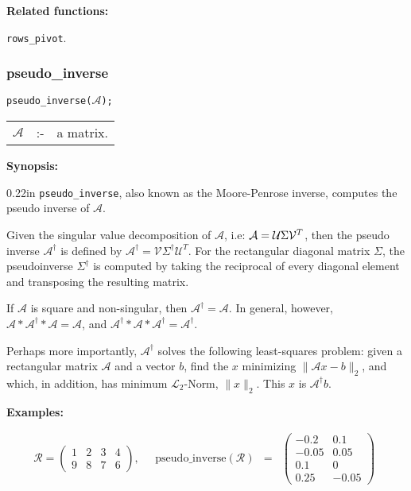 {\bf Related functions:}

\hspace*{0.175in} {\tt rows\_pivot}.


\subsubsection{pseudo\_inverse}
\label{linalg:pseudo_inverse}

\hspace*{0.175in} {\tt pseudo\_inverse($\mathcal{A}$);}

\hspace*{0.1in}  
\begin{tabular}{l l l} 
$\mathcal{A}$ &:-& a matrix.
\end{tabular}

{\bf Synopsis:} %

\begin{addtolength}{\leftskip}{0.22in}
\texttt{pseudo\_inverse}, also known as the Moore-Penrose inverse, computes
the pseudo inverse of $\mathcal{A}$. 

Given the singular value decomposition of $\mathcal{A}$, i.e: $\mathcal{A} = 
{\cal U} 
\Sigma{\cal V}^T$, then the pseudo inverse $\mathcal{A}^{\dagger}$ is defined 
by $\mathcal{A}^{\dagger} = \mathcal{V} \Sigma^{\dagger} \mathcal{U}^{T}$. For the 
rectangular diagonal
matrix $\Sigma$, the pseudoinverse $\Sigma^{\dagger}$ is computed by taking the reciprocal
of every diagonal element and transposing the resulting matrix.

If $\mathcal{A}$ is square and non-singular, then $\mathcal{A}^{\dagger} = \mathcal{A}$.
In general, however,
$\mathcal{A} * \mathcal{A}^{\dagger} * \mathcal{A} = \mathcal{A}$, and
$\mathcal{A}^{\dagger} *  \mathcal{A} * \mathcal{A}^{\dagger} = \mathcal{A}^{\dagger}$.

Perhaps more importantly, $\mathcal{A}^{\dagger}$ solves the following least-squares
problem: given a rectangular matrix $\mathcal{A}$ and a vector $b$, find the
$x$ minimizing $\|\mathcal{A}x - b\|_2$, 
and which, in addition, has minimum $\mathcal{L}_{2}$-Norm, $\|x\|_2$.  
This $x$ is $\mathcal{A}^{\dagger} b$.

\end{addtolength}

{\bf Examples:}
\nopagebreak
\begin{flushleft}
\begin{displaymath}
\mathcal{R} = \left( \begin{array}{cccc} 1 & 2 & 3 & 4 \\ 9 & 8 & 7 & 6
\end{array} \right),
\quad
\begin{array}{ccc}
\text{pseudo\_inverse}(\mathcal{R}) & = & 
        \left( \begin{array}{cc} -0.2 & 0.1 \\ -0.05 & 0.05 \\ 0.1 & 0 
\\ 0.25 & -0.05 
 \end{array} \right) 
\end{array}
\end{displaymath}  
\end{flushleft}

